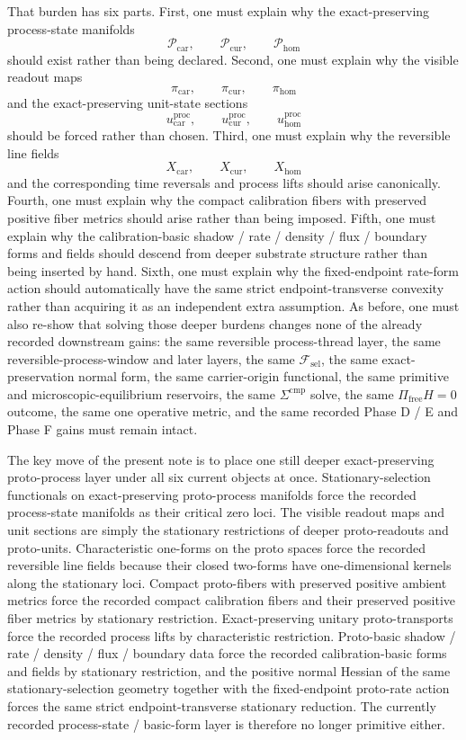 \documentclass[11pt]{article}
\newcommand{\StemFunctional}{\mathscr F_{\mathrm{sel}}}
\newcommand{\TensorProcSpace}{\mathcal P_{\mathrm{car}}}
\newcommand{\CurProcSpace}{\mathcal P_{\mathrm{cur}}}
\newcommand{\HomProcSpace}{\mathcal P_{\mathrm{hom}}}
\newcommand{\TensorProcRead}{\pi_{\mathrm{car}}}
\newcommand{\CurProcRead}{\pi_{\mathrm{cur}}}
\newcommand{\HomProcRead}{\pi_{\mathrm{hom}}}
\newcommand{\TensorProcUnit}{u_{\mathrm{car}}^{\mathrm{proc}}}
\newcommand{\CurProcUnit}{u_{\mathrm{cur}}^{\mathrm{proc}}}
\newcommand{\HomProcUnit}{u_{\mathrm{hom}}^{\mathrm{proc}}}
\newcommand{\TensorFlowField}{X_{\mathrm{car}}}
\newcommand{\CurFlowField}{X_{\mathrm{cur}}}
\newcommand{\HomFlowField}{X_{\mathrm{hom}}}
\begin{document}
That burden has six parts. First, one must explain why the exact-preserving process-state manifolds
\[
\TensorProcSpace,\qquad
\CurProcSpace,\qquad
\HomProcSpace
\]
should exist rather than being declared. Second, one must explain why the visible readout maps
\[
\TensorProcRead,\qquad
\CurProcRead,\qquad
\HomProcRead
\]
and the exact-preserving unit-state sections
\[
\TensorProcUnit,\qquad
\CurProcUnit,\qquad
\HomProcUnit
\]
should be forced rather than chosen. Third, one must explain why the reversible line fields
\[
\TensorFlowField,\qquad
\CurFlowField,\qquad
\HomFlowField
\]
and the corresponding time reversals and process lifts should arise canonically. Fourth, one must explain why the compact calibration fibers with preserved positive fiber metrics should arise rather than being imposed. Fifth, one must explain why the calibration-basic shadow / rate / density / flux / boundary forms and fields should descend from deeper substrate structure rather than being inserted by hand. Sixth, one must explain why the fixed-endpoint rate-form action should automatically have the same strict endpoint-transverse convexity rather than acquiring it as an independent extra assumption. As before, one must also re-show that solving those deeper burdens changes none of the already recorded downstream gains: the same reversible process-thread layer, the same reversible-process-window and later layers, the same \(\StemFunctional\), the same exact-preservation normal form, the same carrier-origin functional, the same primitive and microscopic-equilibrium reservoirs, the same \(\Sigma^{\mathrm{cmp}}\) solve, the same \(\Pi_{\mathrm{free}}H=0\) outcome, the same one operative metric, and the same recorded Phase D / E and Phase F gains must remain intact.

The key move of the present note is to place one still deeper exact-preserving proto-process layer under all six current objects at once. Stationary-selection functionals on exact-preserving proto-process manifolds force the recorded process-state manifolds as their critical zero loci. The visible readout maps and unit sections are simply the stationary restrictions of deeper proto-readouts and proto-units. Characteristic one-forms on the proto spaces force the recorded reversible line fields because their closed two-forms have one-dimensional kernels along the stationary loci. Compact proto-fibers with preserved positive ambient metrics force the recorded compact calibration fibers and their preserved positive fiber metrics by stationary restriction. Exact-preserving unitary proto-transports force the recorded process lifts by characteristic restriction. Proto-basic shadow / rate / density / flux / boundary data force the recorded calibration-basic forms and fields by stationary restriction, and the positive normal Hessian of the same stationary-selection geometry together with the fixed-endpoint proto-rate action forces the same strict endpoint-transverse stationary reduction. The currently recorded process-state / basic-form layer is therefore no longer primitive either.
\end{document}

